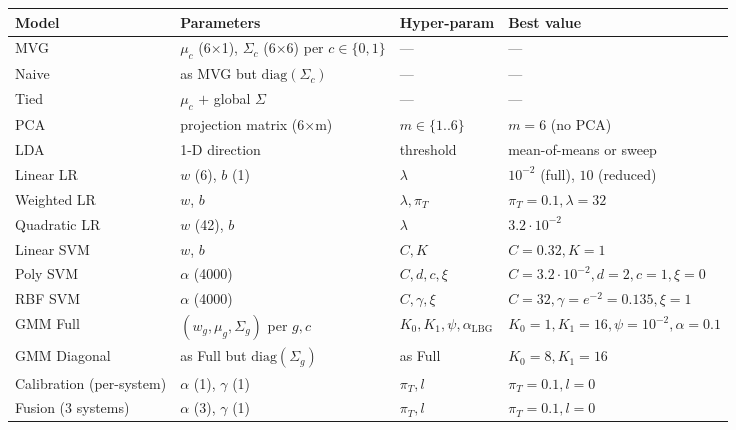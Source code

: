 \documentclass[11pt,a4paper]{article}
\begin{document}
\begin{table}[H]
\centering
\footnotesize
\begin{tabularx}{\textwidth}{lLLL}
\toprule
Model         & Parameters                                       & Hyper-param           & Best value \\
\midrule
MVG           & $\mu_c$ (6$\times$1), $\Sigma_c$ (6$\times$6) per $c\in\{0,1\}$ & ---            & --- \\
Naive         & as MVG but $\textrm{diag}(\Sigma_c)$            & ---                  & --- \\
Tied          & $\mu_c$ $+$ global $\Sigma$                     & ---                  & --- \\
PCA           & projection matrix (6$\times$m)                  & $m\in\{1..6\}$        & $m=6$ (no PCA) \\
LDA           & 1-D direction                                   & threshold            & mean-of-means or sweep \\
Linear LR     & $w$ (6), $b$ (1)                                & $\lambda$             & $10^{-2}$ (full), $10$ (reduced) \\
Weighted LR   & $w$, $b$                                        & $\lambda, \pi_T$       & $\pi_T=0.1, \lambda=32$ \\
Quadratic LR  & $w$ (42), $b$                                   & $\lambda$             & $3.2\cdot 10^{-2}$ \\
Linear SVM    & $w$, $b$                                        & $C, K$                & $C=0.32, K=1$ \\
Poly SVM      & $\alpha$ (4000)                                 & $C, d, c, \xi$        & $C=3.2\cdot 10^{-2}, d=2, c=1, \xi=0$ \\
RBF SVM       & $\alpha$ (4000)                                 & $C, \gamma, \xi$      & $C=32, \gamma=e^{-2}=0.135, \xi=1$ \\
GMM Full      & $(w_g, \mu_g, \Sigma_g)$ per $g, c$              & $K_0, K_1, \psi, \alpha_{\textrm{LBG}}$ & $K_0=1, K_1=16, \psi=10^{-2}, \alpha=0.1$ \\
GMM Diagonal  & as Full but $\textrm{diag}(\Sigma_g)$            & as Full              & $K_0=8, K_1=16$ \\
Calibration (per-system) & $\alpha$ (1), $\gamma$ (1)            & $\pi_T, l$           & $\pi_T=0.1, l=0$ \\
Fusion (3 systems)       & $\alpha$ (3), $\gamma$ (1)            & $\pi_T, l$           & $\pi_T=0.1, l=0$ \\
\bottomrule
\end{tabularx}
\end{table}
\end{document}
